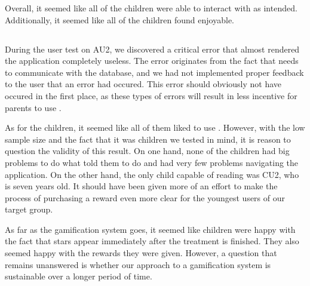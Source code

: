 Overall, it seemed like all of the children were able to interact with \ab{} as intended. Additionally, it seemed like all of the children found \ab{} enjoyable. 

\subsection{\app{}}

During the user test on AU2, we discovered a critical error that almost rendered the application completely useless. The error originates from the fact that \app{} needs to communicate with the database, and we had not implemented proper feedback to the user that an error had occured. This error should obviously not have occured in the first place, as these types of errors will result in less incentive for parents to use \app{}. 

As for the children, it seemed like all of them liked to use \app{}. However, with the low sample size and the fact that it was children we tested in mind, it is reason to question the validity of this result. On one hand, none of the children had big problems to do what \app{} told them to do and had very few problems navigating the application. On the other hand, the only child capable of reading was CU2, who is seven years old. It should have been given more of an effort to make the process of purchasing a reward even more clear for the youngest users of our target group.     

As far as the gamification system goes, it seemed like children were happy with the fact that stars appear immediately after the treatment is finished. They also seemed happy with the rewards they were given. However, a question that remains unanswered is whether our approach to a gamification system is sustainable over a longer period of time. 


